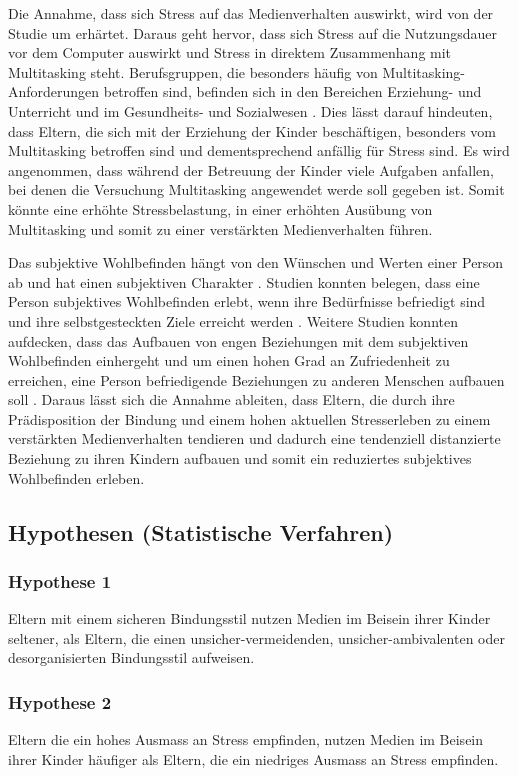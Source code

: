 Die Annahme, dass sich Stress auf das Medienverhalten auswirkt, wird von der Studie um  erhärtet. Daraus geht hervor, dass sich Stress auf die Nutzungsdauer vor dem Computer auswirkt und Stress in direktem Zusammenhang mit Multitasking steht. Berufsgruppen, die besonders häufig von Multitasking-Anforderungen betroffen sind, befinden sich in den Bereichen Erziehung- und Unterricht und im Gesundheits- und Sozialwesen \cite{Lohmann2012}. Dies lässt darauf hindeuten, dass Eltern, die sich mit der Erziehung der Kinder beschäftigen, besonders vom Multitasking betroffen sind und dementsprechend anfällig für Stress sind. Es wird angenommen, dass während der Betreuung der Kinder viele Aufgaben anfallen, bei denen die Versuchung Multitasking angewendet werde soll gegeben ist. Somit könnte eine erhöhte Stressbelastung, in einer erhöhten Ausübung von Multitasking und somit zu einer verstärkten Medienverhalten führen.

Das subjektive Wohlbefinden hängt von den Wünschen und Werten einer Person ab und hat einen subjektiven Charakter \cite{Odaci2014}. Studien konnten belegen, dass eine Person subjektives Wohlbefinden erlebt, wenn ihre Bedürfnisse befriedigt sind und ihre selbstgesteckten Ziele erreicht werden \cite{Diener1999}. Weitere Studien konnten aufdecken, dass das Aufbauen von engen Beziehungen mit dem subjektiven Wohlbefinden einhergeht \cite{Kasser1996} und um einen hohen Grad an Zufriedenheit zu erreichen, eine Person befriedigende Beziehungen zu anderen Menschen aufbauen soll \cite{Celik2013}.
Daraus lässt sich die Annahme ableiten, dass Eltern, die durch ihre Prädisposition der Bindung und einem hohen aktuellen Stresserleben zu einem verstärkten Medienverhalten tendieren und dadurch eine tendenziell distanzierte Beziehung zu ihren Kindern aufbauen und somit ein reduziertes subjektives Wohlbefinden erleben.

\subsection{Hypothesen (Statistische Verfahren)}
\subsubsection{Hypothese 1}
Eltern mit einem sicheren Bindungsstil nutzen Medien im Beisein ihrer Kinder seltener, als Eltern, die einen unsicher-vermeidenden, unsicher-ambivalenten oder desorganisierten Bindungsstil aufweisen.
\subsubsection{Hypothese 2}
Eltern die ein hohes Ausmass an Stress empfinden, nutzen Medien im Beisein ihrer Kinder häufiger als Eltern, die ein niedriges Ausmass an Stress empfinden.
